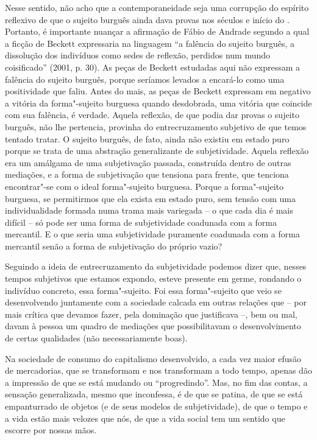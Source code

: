 Nesse sentido, não acho que a contemporaneidade seja uma
corrupção do espírito reflexivo de que o sujeito burguês ainda dava provas
nos séculos  e início do . Portanto, é importante nuançar
a afirmação de Fábio de Andrade segundo a qual a ficção de Beckett
expressaria na linguagem ``a falência do sujeito burguês, a dissolução
dos indivíduos como sedes de reflexão, perdidos num mundo coisificado''
(2001, p. 30). As peças de Beckett estudadas aqui não
expressam a falência do sujeito burguês, porque seríamos levados a
encará-lo como uma positividade que faliu. Antes do
mais, as peças de Beckett expressam em negativo a vitória da
forma"-sujeito burguesa quando desdobrada, uma vitória que coincide com
sua falência, é verdade. Aquela reflexão, de que podia dar provas o
sujeito burguês, não lhe pertencia, provinha do entrecruzamento
subjetivo de que temos tentado tratar. O sujeito burguês, de fato, ainda
não existiu em estado puro porque se trata de uma abstração
generalizante de subjetividade. Aquela reflexão era um amálgama de uma
subjetivação passada, construída dentro de outras mediações, e a forma
de subjetivação que tensiona para frente, que tenciona encontrar"-se com
o ideal forma"-sujeito burguesa. Porque a forma"-sujeito burguesa, se
permitirmos que ela exista em estado puro, sem tensão com uma
individualidade formada numa trama mais variegada -- o que cada dia é
mais difícil -- só pode ser uma forma de subjetividade coadunada com a
forma mercantil. E o que seria uma subjetividade puramente coadunada com
a forma mercantil senão a forma de subjetivação do próprio vazio?

Seguindo a ideia de entrecruzamento da subjetividade podemos dizer que, nesses tempos subjetivos que estamos expondo, esteve presente em germe, rondando o indivíduo concreto, essa
forma"-sujeito. Foi essa forma"-sujeito que veio se desenvolvendo
juntamente com a sociedade calcada em outras relações que -- por mais
crítica que devamos fazer, pela dominação que justificava --, bem ou
mal, davam à pessoa um quadro de mediações que possibilitavam o
desenvolvimento de certas qualidades (não necessariamente boas).

Na sociedade de consumo do capitalismo desenvolvido, a cada vez maior
efusão de mercadorias, que se transformam e nos transformam a todo
tempo, apenas dão a impressão de que se está mudando ou ``progredindo''.
Mas, no fim das contas, a sensação generalizada, mesmo que inconfessa, é
de que se patina, de que se está empanturrado de objetos (e de seus
modelos de subjetividade), de que o tempo e a vida estão mais velozes
que nós, de que a vida social tem um sentido que escorre por nossas
mãos.

